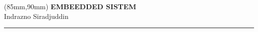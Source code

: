 \documentclass[12pt]{extreport}
\begin{document}



\thispagestyle{empty}
\begin{textblock*}{60mm}(85mm,90mm)
	\noindent
	{\sffamily\LARGE\bfseries EMBEEDDED SISTEM}\\
	\noindent
	{\sffamily\small Indrazno Siradjuddin}\\
	{\color{dark-gray}\rule[5pt]{170pt}{3pt}}
\end{textblock*}
\null\newpage

% 


\thispagestyle{empty}
\null\newpage

\renewcommand\contentsname{Table of Contents} %
\tableofcontents



\thispagestyle{empty}
\null\newpage

\setcounter{page}{1}




% 
% 
% 
% 
% 
% 
% 
% 
% 
% 
% 
%     
%     
\ifodd\value{page}
\thispagestyle{empty}
\null\newpage
\fi
\end{document}
